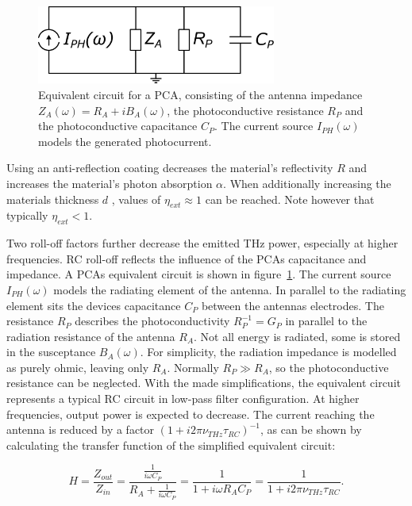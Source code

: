 \begin{figure}[ht]
	\centering
	\includegraphics[width=0.7\textwidth]{figures/eq_circuit_PCA.pdf}
	\captionsetup{width=\textwidth}
	\caption{Equivalent circuit for a PCA, consisting of the antenna impedance $Z_A(\omega) = R_A + iB_A(\omega)$, the photoconductive resistance $R_P$ and the photoconductive capacitance $C_P$. The current source $I_{PH}(\omega)$ models the generated photocurrent.}
	\label{PCA_eq}
\end{figure}

Using an anti-reflection coating decreases the material's reflectivity $R$ and increases the material's photon absorption $\alpha$. When additionally increasing the materials thickness $d$ , values of $\eta_{ext} \approx 1$ can be reached. Note however that typically $\eta_{ext} < 1$. 

Two roll-off factors further decrease the emitted THz power, especially at higher frequencies. RC roll-off reflects the influence of the PCAs capacitance and impedance. A PCAs equivalent circuit \cite{fernandezolveraInternationalSystemUnits2019,collinLimitationsTheveninNorton2003} is shown in figure~\ref{PCA_eq}. The current source $I_{PH}(\omega)$ models the radiating element of the antenna. In parallel to the radiating element sits the devices capacitance $C_P$ between the antennas electrodes. The resistance $R_P$ describes the photoconductivity $R_P^{-1} = G_P$ in parallel to the radiation resistance of the antenna $R_A$. Not all energy is radiated, some is stored in the susceptance $B_A(\omega)$. For simplicity, the radiation impedance is modelled as purely ohmic, leaving only $R_A$. Normally $R_{P} \gg R_A$, so the photoconductive resistance can be neglected.  With the made simplifications, the equivalent circuit represents a typical RC circuit in low-pass filter configuration. At higher frequencies, output power is expected to decrease. The current reaching the antenna is reduced by a factor $(1 + i2\pi \nu_{THz}\tau_{RC})^{-1}$, as can be shown by calculating the transfer function of the simplified equivalent circuit: 

\begin{equation}
    H = \frac{Z_{out}}{Z_{in}} = \frac{\frac{1}{i\omega C_P}}{R_A + \frac{1}{i\omega C_P}} = \frac{1}{1 + i\omega R_A C_P} = \frac{1}{1 + i 2\pi \nu_{THz} \tau_{RC}}.    
	\label{transferfunction}
\end{equation}

